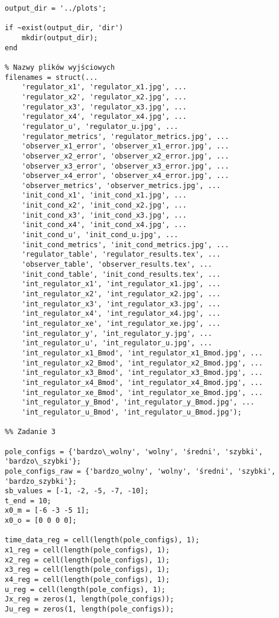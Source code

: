 \documentclass[a4paper,titlepage,11pt,floatssmall]{mwrep} %
\begin{document}
\begin{lstlisting}[style=custommatlab, caption={Pełny kod skryptu \texttt{combined\_plots.m}.}, label={lst:init_full}]
output_dir = '../plots';

if ~exist(output_dir, 'dir')
    mkdir(output_dir);
end

% Nazwy plików wyjściowych
filenames = struct(...
    'regulator_x1', 'regulator_x1.jpg', ...
    'regulator_x2', 'regulator_x2.jpg', ...
    'regulator_x3', 'regulator_x3.jpg', ...
    'regulator_x4', 'regulator_x4.jpg', ...
    'regulator_u', 'regulator_u.jpg', ...
    'regulator_metrics', 'regulator_metrics.jpg', ...
    'observer_x1_error', 'observer_x1_error.jpg', ...
    'observer_x2_error', 'observer_x2_error.jpg', ...
    'observer_x3_error', 'observer_x3_error.jpg', ...
    'observer_x4_error', 'observer_x4_error.jpg', ...
    'observer_metrics', 'observer_metrics.jpg', ...
    'init_cond_x1', 'init_cond_x1.jpg', ...
    'init_cond_x2', 'init_cond_x2.jpg', ...
    'init_cond_x3', 'init_cond_x3.jpg', ...
    'init_cond_x4', 'init_cond_x4.jpg', ...
    'init_cond_u', 'init_cond_u.jpg', ...
    'init_cond_metrics', 'init_cond_metrics.jpg', ...
    'regulator_table', 'regulator_results.tex', ...
    'observer_table', 'observer_results.tex', ...
    'init_cond_table', 'init_cond_results.tex', ...
    'int_regulator_x1', 'int_regulator_x1.jpg', ...
    'int_regulator_x2', 'int_regulator_x2.jpg', ...
    'int_regulator_x3', 'int_regulator_x3.jpg', ...
    'int_regulator_x4', 'int_regulator_x4.jpg', ...
    'int_regulator_xe', 'int_regulator_xe.jpg', ...
    'int_regulator_y', 'int_regulator_y.jpg', ...
    'int_regulator_u', 'int_regulator_u.jpg', ...
    'int_regulator_x1_Bmod', 'int_regulator_x1_Bmod.jpg', ...
    'int_regulator_x2_Bmod', 'int_regulator_x2_Bmod.jpg', ...
    'int_regulator_x3_Bmod', 'int_regulator_x3_Bmod.jpg', ...
    'int_regulator_x4_Bmod', 'int_regulator_x4_Bmod.jpg', ...
    'int_regulator_xe_Bmod', 'int_regulator_xe_Bmod.jpg', ...
    'int_regulator_y_Bmod', 'int_regulator_y_Bmod.jpg', ...
    'int_regulator_u_Bmod', 'int_regulator_u_Bmod.jpg');

%% Zadanie 3

pole_configs = {'bardzo\_wolny', 'wolny', 'średni', 'szybki', 'bardzo\_szybki'};
pole_configs_raw = {'bardzo_wolny', 'wolny', 'średni', 'szybki', 'bardzo_szybki'};
sb_values = [-1, -2, -5, -7, -10];
t_end = 10;
x0_m = [-6 -3 -5 1];
x0_o = [0 0 0 0];

time_data_reg = cell(length(pole_configs), 1);
x1_reg = cell(length(pole_configs), 1);
x2_reg = cell(length(pole_configs), 1);
x3_reg = cell(length(pole_configs), 1);
x4_reg = cell(length(pole_configs), 1);
u_reg = cell(length(pole_configs), 1);
Jx_reg = zeros(1, length(pole_configs));
Ju_reg = zeros(1, length(pole_configs));


\end{lstlisting}
\end{document}
